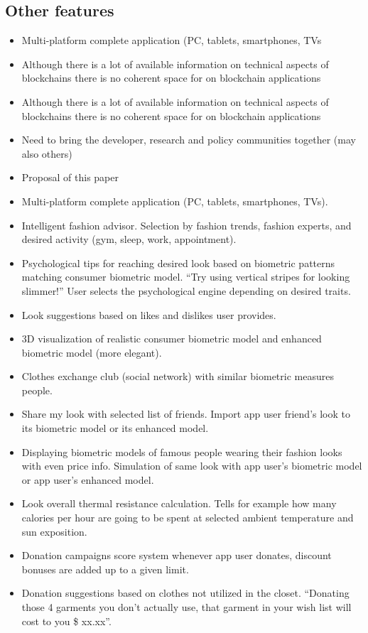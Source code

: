 \documentclass[twoside,twocolumn]{article}
\begin{document}
\subsection{Other features}

\begin{itemize}
	\item Multi-platform complete application (PC, tablets, smartphones, TVs
	\item Although there is a lot of available information on technical aspects
	of blockchains there is no coherent space for on blockchain applications
	\item Although there is a lot of available information on technical aspects
	of blockchains there is no coherent space for on blockchain applications
	\item Need to bring the developer, research and policy
	communities together (may also others)
	\item Proposal of this paper
	\item Multi-platform complete application (PC, tablets, smartphones, TVs).
	\item Intelligent fashion advisor. Selection by fashion trends, fashion experts, and desired activity (gym, sleep, work, appointment).
	\item Psychological tips for reaching desired look based on biometric patterns
	matching consumer biometric model. ``Try using vertical stripes for looking
	slimmer!'' User selects the psychological engine depending on desired traits.
	\item Look suggestions based on likes and dislikes user provides.
	\item 3D visualization of realistic consumer biometric model and enhanced biometric model (more elegant).
	\item Clothes exchange club (social network) with similar biometric measures people.
	\item Share my look with selected list of friends. Import app user friend's look to its biometric model or its enhanced model.
	\item Displaying biometric models of famous people wearing their fashion looks with even price info. Simulation of same look with app user's biometric model or app user's enhanced model.
	\item Look overall thermal resistance calculation. Tells for example how many calories per hour are going to be spent at selected ambient temperature and sun exposition.
	\item Donation campaigns score system whenever app user donates, discount bonuses are added up to a given limit.
	\item Donation suggestions based on clothes not utilized in the closet.
	``Donating those 4 garments you don't actually use, that garment in your wish list will cost to you \$ xx.xx''.
\end{itemize}
\end{document}
